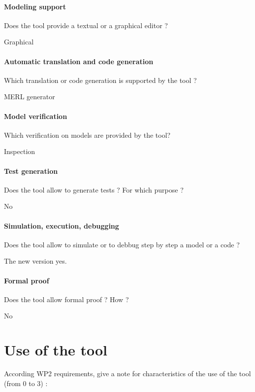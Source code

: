 \paragraph{Modeling support}
Does the tool provide a  textual or a graphical editor ?

Graphical
\paragraph{Automatic translation and code generation}
Which translation or code generation is supported by the tool ?

MERL generator
\paragraph{Model verification}
Which verification on models are provided by the tool?

Inspection

\paragraph{Test generation}
Does the tool allow to generate tests ? For  which purpose ?

No
\paragraph{Simulation, execution, debugging}
Does the tool allow to simulate or to debbug step by step a model or a code ?


The new version yes.
\paragraph{Formal proof}
Does the tool allow formal proof ?  How ?

No

\section{Use of the tool}


According WP2 requirements, give a note for characteristics of the use of the tool (from 0 to 3) :

